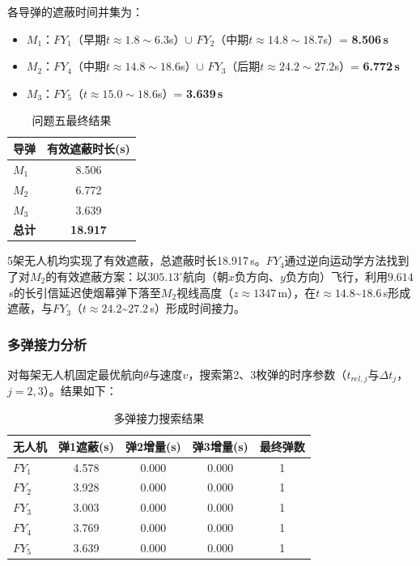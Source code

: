 \documentclass[12pt,a4paper]{article}
\begin{document}
各导弹的遮蔽时间并集为：
\begin{itemize}[nosep]
  \item $M_1$：$FY_1$（早期$t\approx1.8\sim6.3$s）$\cup$ $FY_2$（中期$t\approx14.8\sim18.7$s）= \textbf{8.506\,s}
  \item $M_2$：$FY_4$（中期$t\approx14.8\sim18.6$s）$\cup$ $FY_3$（后期$t\approx24.2\sim27.2$s）= \textbf{6.772\,s}
  \item $M_3$：$FY_5$（$t\approx15.0\sim18.6$s）= \textbf{3.639\,s}
\end{itemize}

\begin{table}[H]
\centering
\caption{问题五最终结果}
\begin{tabular}{lc}
\toprule
导弹 & 有效遮蔽时长(s) \\
\midrule
$M_1$ & 8.506 \\
$M_2$ & 6.772 \\
$M_3$ & 3.639 \\
\midrule
\textbf{总计} & \textbf{18.917} \\
\bottomrule
\end{tabular}
\end{table}

5架无人机均实现了有效遮蔽，总遮蔽时长18.917\,s。$FY_4$通过逆向运动学方法找到了对$M_2$的有效遮蔽方案：以$305.13^\circ$航向（朝$x$负方向、$y$负方向）飞行，利用$9.614$\,s的长引信延迟使烟幕弹下落至$M_2$视线高度（$z \approx 1347$\,m），在$t \approx 14.8$\textasciitilde$18.6$\,s形成遮蔽，与$FY_3$（$t \approx 24.2$\textasciitilde$27.2$\,s）形成时间接力。

\subsubsection{多弹接力分析}

对每架无人机固定最优航向$\theta$与速度$v$，搜索第2、3枚弹的时序参数（$t_{rel,j}$与$\Delta t_j$，$j=2,3$）。结果如下：

\begin{table}[H]
\centering
\caption{多弹接力搜索结果}
\begin{tabular}{lcccc}
\toprule
无人机 & 弹1遮蔽(s) & 弹2增量(s) & 弹3增量(s) & 最终弹数 \\
\midrule
$FY_1$ & 4.578 & 0.000 & 0.000 & 1 \\
$FY_2$ & 3.928 & 0.000 & 0.000 & 1 \\
$FY_3$ & 3.003 & 0.000 & 0.000 & 1 \\
$FY_4$ & 3.769 & 0.000 & 0.000 & 1 \\
$FY_5$ & 3.639 & 0.000 & 0.000 & 1 \\
\bottomrule
\end{tabular}
\end{table}
\end{document}

